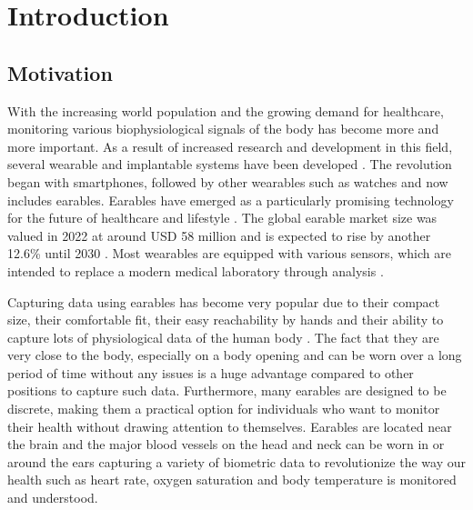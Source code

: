 \chapter{Introduction}
\label{ch:Introduction}

\section{Motivation}
\label{ch:Introduction:Motivation}
With the increasing world population and the growing demand for healthcare, monitoring various biophysiological signals of the body has become more and more important. 
As a result of increased research and development in this field, several wearable and implantable systems have been developed \cite{loncar-turukaloLiteratureWearableTechnology2019}.
The revolution began with smartphones, followed by other wearables such as watches and now includes earables.
Earables have emerged as a particularly promising technology for the future of healthcare and lifestyle \cite{trespGoingDigitalSurvey2016, kirkWearablesRevolutionStandardization2014a}. 
The global earable market size was valued in 2022 at around USD 58 million and is expected to rise by another 12.6\% until 2030 \cite{GlobalEarphonesHeadphones2018}.
Most wearables are equipped with various sensors, which are intended to replace a modern medical laboratory through analysis \cite{loncar-turukaloLiteratureWearableTechnology2019}.

Capturing data using earables has become very popular due to their compact size, their comfortable fit, their easy reachability by hands and their ability to capture lots of physiological data of the human body \cite{roddigerSensingEarablesSystematic2022a}. 
The fact that they are very close to the body, especially on a body opening and can be worn over a long period of time without any issues is a huge advantage compared to other positions to capture such data.
Furthermore, many earables are designed to be discrete, making them a practical option for individuals who want to monitor their health without drawing attention to themselves.
Earables are located near the brain and the major blood vessels on the head and neck can be worn in or around the ears capturing a variety of biometric data to revolutionize the way our health such as heart rate, oxygen saturation and body temperature is monitored and understood.

